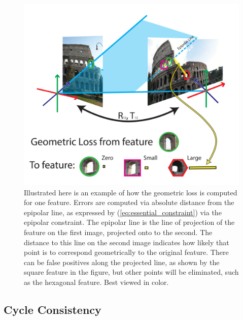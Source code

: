 \documentclass[10pt,twocolumn,letterpaper]{article}
\begin{document}
\begin{figure}[t]
\begin{center}
  \includegraphics[width=0.8\linewidth]{figures-GeometricConsistency-v2.pdf}
\end{center}
  \caption{
    Illustrated here is an example of how the geometric loss is computed for one feature.  
    Errors are computed via absolute distance from the epipolar line, as expressed by (\ref{eq:essential_constraint}) via the epipolar constraint.
    The epipolar line is the line of projection of the feature on the first image, projected onto to the second.
    The distance to this line on the second image indicates how likely that point is to correspond geometrically to the original feature.
    There can be false positives along the projected line, as shown by the square feature in the figure, but other points will be eliminated, such as the hexagonal feature.
    Best viewed in color.
  }
\label{fig:geoconsist}
\label{fig:onecol}
\end{figure}

\subsection{Cycle Consistency}
\end{document}
